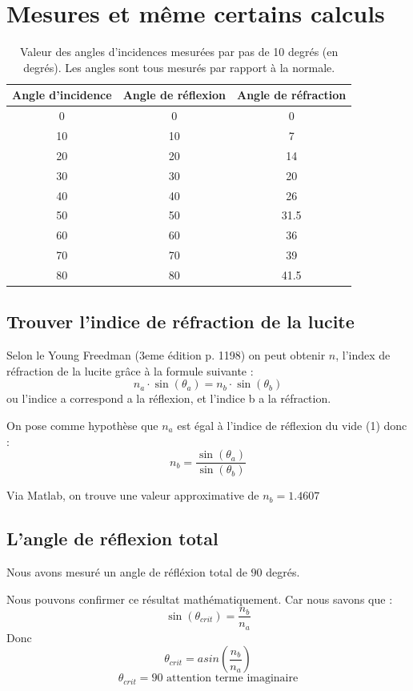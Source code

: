 \documentclass[a4paper,11pt]{article}
\begin{document}
\section{Mesures et même certains calculs} 
\begin{table}[!h]
	\begin{center}
	\begin{tabular}{|c|c|c|}
	\hline
		Angle d'incidence & Angle de réflexion & Angle de réfraction \\
	\hline
		0 & 0 & 0 \\
		10 & 10 & 7 \\
		20 & 20 & 14 \\
		30 & 30 & 20 \\
		40 & 40 & 26 \\
		50 & 50 & 31.5 \\
		60 & 60 & 36 \\
		70 & 70 & 39 \\
		80 & 80 & 41.5 \\
	\hline
	\end{tabular}
	\end{center}
	\caption{Valeur des angles d'incidences mesurées par pas de 10 degrés (en degrés). Les angles sont tous mesurés par rapport à la normale.}
\end{table}
\subsection{Trouver l'indice de réfraction de la lucite}

Selon le Young Freedman (3eme édition p. 1198) on peut obtenir $n$, l'index de réfraction de la lucite grâce à la formule suivante : 
$$ n_a \cdot \sin (\theta_a) = n_b \cdot \sin (\theta_b)$$
ou l'indice a correspond a la réflexion, et l'indice b a la réfraction.

On pose comme hypothèse que $n_a$ est égal à l'indice de réflexion du vide (1) donc :
$$ n_b = \frac{\sin (\theta_a)}{\sin (\theta_b)} $$

Via Matlab, on trouve une valeur approximative de $n_b = 1.4607$

\subsection{L'angle de réflexion total}
Nous avons mesuré un angle de réfléxion total de $90$ degrés.

Nous pouvons confirmer ce résultat mathématiquement. Car nous savons que :
$$ \sin (\theta_{crit} ) = \frac{n_b}{n_a} $$
Donc $$ \theta_{crit} = asin (\frac{n_b}{n_a} ) $$
$$ \theta_{crit} = 90 \text{ attention terme imaginaire}$$
\end{document}
